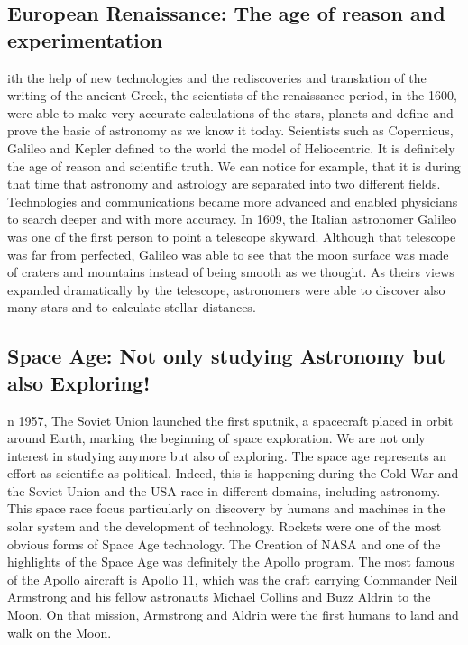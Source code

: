 \subsection*{European Renaissance: The age of reason and experimentation}
ith the help of new technologies and the rediscoveries and translation of the writing of the ancient Greek, the scientists of the renaissance period, in the 1600, were able to make very accurate calculations of the stars, planets and define and prove the basic of astronomy as we know it today.  
Scientists such as Copernicus, Galileo and Kepler defined to the world the model of Heliocentric. 
It is definitely the age of reason and scientific truth. 
We can notice for example, that it is during that time that astronomy and astrology are separated into two different fields. 
Technologies and communications became more advanced and enabled physicians to search deeper and with more accuracy. 
In 1609, the Italian astronomer Galileo was one of the first person to point a telescope skyward. 
Although that telescope was far from perfected, Galileo was able to see that the moon surface was made of craters and mountains instead of being smooth as we thought. 
As theirs views expanded dramatically by the telescope, astronomers were able to discover also many stars and to calculate stellar distances. 

\subsection*{Space Age: Not only studying Astronomy but also Exploring!}
n 1957, The Soviet Union launched the first sputnik, a spacecraft placed in orbit around Earth, marking the beginning of space exploration.
We are not only interest in studying anymore but also of exploring.
The space age represents an effort as scientific as political.
Indeed, this is happening during the Cold War and the Soviet Union and the USA race in different domains, including astronomy.
This space race focus particularly on discovery by humans and machines in the solar system and the development of technology.
Rockets were one of the most obvious forms of Space Age technology.
The Creation of NASA and one of the highlights of the Space Age was definitely the Apollo program. The most famous of the Apollo aircraft is Apollo 11, which was the craft carrying Commander Neil Armstrong and his fellow astronauts Michael Collins and Buzz Aldrin to the Moon.
On that mission, Armstrong and Aldrin were the first humans to land and walk on the Moon.